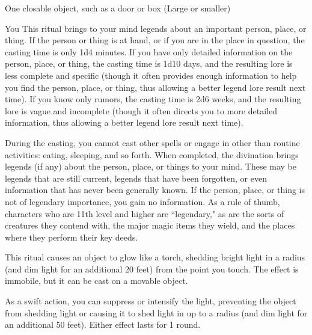 \begin{spelltarget}{One closable object, such as a door or box (Large or smaller)}
\begin{spelltarget}{You}
\spelleffect This ritual brings to your mind legends about an important person, place, or thing. If the person or thing is at hand, or if you are in the place in question, the casting time is only 1d4 minutes. If you have only detailed information on the person, place, or thing, the casting time is 1d10 days, and the resulting lore is less complete and specific (though it often provides enough information to help you find the person, place, or thing, thus allowing a better legend lore result next time). If you know only rumors, the casting time is 2d6 weeks, and the resulting lore is vague and incomplete (though it often directs you to more detailed information, thus allowing a better legend lore result next time).
\par During the casting, you cannot cast other spells or engage in other than routine activities: eating, sleeping, and so forth. When completed, the divination brings legends (if any) about the person, place, or things to your mind. These may be legends that are still current, legends that have been forgotten, or even information that has never been generally known. If the person, place, or thing is not of legendary importance, you gain no information. As a rule of thumb, characters who are 11th level and higher are ``legendary," as are the sorts of creatures they contend with, the major magic items they wield, and the places where they perform their key deeds.

\spelldur{\durlong \dismissable}
\spelleffect This ritual causes an object to glow like a torch, shedding bright light in a \areamed radius (and dim light for an additional 20 feet) from the point you touch. The effect is immobile, but it can be cast on a movable object.

As a swift action, you can suppress or intensify the light, preventing the object from shedding light or causing it to shed light in up to a \arealarge radius (and dim light for an additional 50 feet). Either effect lasts for 1 round.


\end{spelltarget}
\end{spelltarget}
